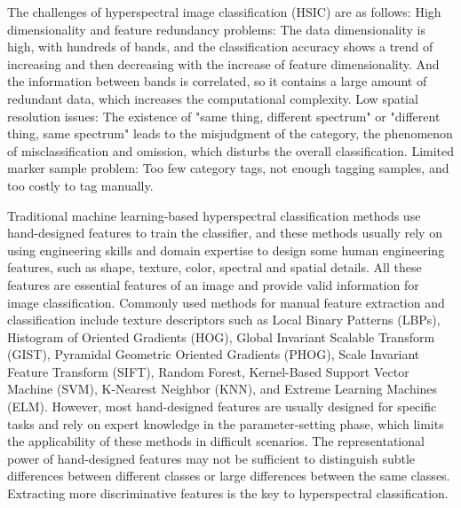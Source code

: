 \documentclass[]{interact}
\theoremstyle{plain}%
\theoremstyle{definition}
\theoremstyle{remark}
\begin{document}
The challenges of hyperspectral image classification (HSIC) are as follows: High dimensionality and feature redundancy problems: The data dimensionality is high, with hundreds of bands, and the classification accuracy shows a trend of increasing and then decreasing with the increase of feature dimensionality. And the information between bands is correlated, so it contains a large amount of redundant data, which increases the computational complexity. Low spatial resolution issues: The existence of "same thing, different spectrum" or "different thing, same spectrum" leads to the misjudgment of the category, the phenomenon of misclassification and omission, which disturbs the overall classification. Limited marker sample problem: Too few category tags, not enough tagging samples, and too costly to tag manually.

Traditional machine learning-based hyperspectral classification methods use hand-designed features to train the classifier, and these methods usually rely on using engineering skills and domain expertise to design some human engineering features, such as shape, texture, color, spectral and spatial details. All these features are essential features of an image and provide valid information for image classification. Commonly used methods for manual feature extraction and classification include texture descriptors such as Local Binary Patterns (LBPs), Histogram of Oriented Gradients (HOG), Global Invariant Scalable Transform (GIST), Pyramidal Geometric Oriented Gradients (PHOG), Scale Invariant Feature Transform (SIFT), Random Forest, Kernel-Based Support Vector Machine (SVM), K-Nearest Neighbor (KNN), and Extreme Learning Machines (ELM). However, most hand-designed features are usually designed for specific tasks and rely on expert knowledge in the parameter-setting phase, which limits the applicability of these methods in difficult scenarios. The representational power of hand-designed features may not be sufficient to distinguish subtle differences between different classes or large differences between the same classes. Extracting more discriminative features is the key to hyperspectral classification.
\end{document}

